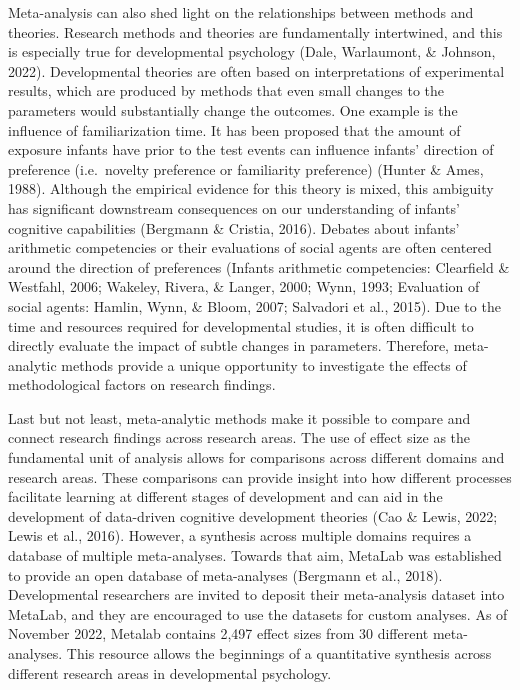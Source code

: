 \documentclass[10pt, letterpaper]{article}
\begin{document}
Meta-analysis can also shed light on the relationships between methods
and theories. Research methods and theories are fundamentally
intertwined, and this is especially true for developmental psychology
(Dale, Warlaumont, \& Johnson, 2022). Developmental theories are often
based on interpretations of experimental results, which are produced by
methods that even small changes to the parameters would substantially
change the outcomes. One example is the influence of familiarization
time. It has been proposed that the amount of exposure infants have
prior to the test events can influence infants' direction of preference
(i.e.~novelty preference or familiarity preference) (Hunter \& Ames,
1988). Although the empirical evidence for this theory is mixed, this
ambiguity has significant downstream consequences on our understanding
of infants' cognitive capabilities (Bergmann \& Cristia, 2016). Debates
about infants' arithmetic competencies or their evaluations of social
agents are often centered around the direction of preferences (Infants
arithmetic competencies: Clearfield \& Westfahl, 2006; Wakeley, Rivera,
\& Langer, 2000; Wynn, 1993; Evaluation of social agents: Hamlin, Wynn,
\& Bloom, 2007; Salvadori et al., 2015). Due to the time and resources
required for developmental studies, it is often difficult to directly
evaluate the impact of subtle changes in parameters. Therefore,
meta-analytic methods provide a unique opportunity to investigate the
effects of methodological factors on research findings.

Last but not least, meta-analytic methods make it possible to compare
and connect research findings across research areas. The use of effect
size as the fundamental unit of analysis allows for comparisons across
different domains and research areas. These comparisons can provide
insight into how different processes facilitate learning at different
stages of development and can aid in the development of data-driven
cognitive development theories (Cao \& Lewis, 2022; Lewis et al., 2016).
However, a synthesis across multiple domains requires a database of
multiple meta-analyses. Towards that aim, MetaLab was established to
provide an open database of meta-analyses (Bergmann et al., 2018).
Developmental researchers are invited to deposit their meta-analysis
dataset into MetaLab, and they are encouraged to use the datasets for
custom analyses. As of November 2022, Metalab contains 2,497 effect
sizes from 30 different meta-analyses. This resource allows the
beginnings of a quantitative synthesis across different research areas
in developmental psychology.
\end{document}
